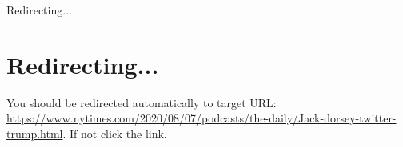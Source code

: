 Redirecting...

\hypertarget{redirecting}{%
\section{Redirecting...}\label{redirecting}}

You should be redirected automatically to target URL:
\href{https://www.nytimes.com/2020/08/07/podcasts/the-daily/Jack-dorsey-twitter-trump.html}{https://www.nytimes.com/2020/08/07/podcasts/the-daily/Jack-dorsey-twitter-trump.html}.
If not click the link.
